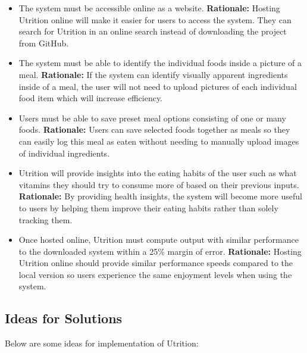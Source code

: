 \documentclass[12pt]{article}
\newcounter{FRCounter}
\newcommand{\FillFRNumber}{\textbf{FR\arabic{FRCounter}.} \stepcounter{FRCounter}}
\begin{document}
\begin{itemize}
	\item [\FillFRNumber] The system must be accessible online as a website.\newline
	\textbf{Rationale:} Hosting Utrition online will make it easier for users to access the system. They can search for Utrition in an online search instead of downloading the project from GitHub.
	
	\item [\FillFRNumber] The system must be able to identify the individual foods inside a picture of a meal.\newline
	\textbf{Rationale:} If the system can identify visually apparent ingredients inside of a meal, the user will not need to upload pictures of each individual food item which will increase efficiency.
	
	\item [\FillFRNumber] Users must be able to save preset meal options consisting of one or many foods.\newline
	\textbf{Rationale:} Users can save selected foods together as meals so they can easily log this meal as eaten without needing to manually upload images of individual ingredients.
	
	\item [\FillFRNumber] Utrition will provide insights into the eating habits of the user such as what vitamins they should try to consume more of based on their previous inputs.\newline
	\textbf{Rationale:} By providing health insights, the system will become more useful to users by helping them improve their eating habits rather than solely tracking them.
	
	\item [NF?.] Once hosted online, Utrition must compute output with similar performance to the downloaded system within a 25\% margin of error.\newline
	\textbf{Rationale:} Hosting Utrition online should provide similar performance speeds compared to the local version so users experience the same enjoyment levels when using the system.
	
\end{itemize}

\subsection{Ideas for Solutions}

Below are some ideas for implementation of Utrition:
\end{document}
